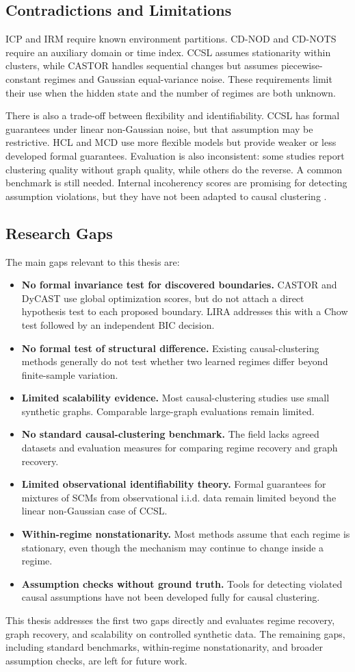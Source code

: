 \subsection{Contradictions and Limitations}

ICP and IRM require known environment partitions. CD-NOD and CD-NOTS require an
auxiliary domain or time index. CCSL assumes stationarity within clusters, while
CASTOR handles sequential changes but assumes piecewise-constant regimes and
Gaussian equal-variance noise. These requirements limit their use when the hidden
state and the number of regimes are both unknown.

There is also a trade-off between flexibility and identifiability. CCSL has formal
guarantees under linear non-Gaussian noise, but that assumption may be restrictive.
HCL and MCD use more flexible models but provide weaker or less developed formal
guarantees. Evaluation is also inconsistent: some studies report clustering quality
without graph quality, while others do the reverse. A common benchmark is still
needed. Internal incoherency scores are promising for detecting assumption
violations, but they have not been adapted to causal clustering
\cite{faltenbacher2025internal}.

\subsection{Research Gaps}
\label{ssec:gaps}

The main gaps relevant to this thesis are:
\begin{itemize}[leftmargin=1.4em]
\item \textbf{No formal invariance test for discovered boundaries.} CASTOR and
DyCAST use global optimization scores, but do not attach a direct hypothesis test
to each proposed boundary. LIRA addresses this with a Chow test followed by an
independent BIC decision.
\item \textbf{No formal test of structural difference.} Existing causal-clustering
methods generally do not test whether two learned regimes differ beyond finite-sample
variation.
\item \textbf{Limited scalability evidence.} Most causal-clustering studies use
small synthetic graphs. Comparable large-graph evaluations remain limited.
\item \textbf{No standard causal-clustering benchmark.} The field lacks agreed
datasets and evaluation measures for comparing regime recovery and graph recovery.
\item \textbf{Limited observational identifiability theory.} Formal guarantees for
mixtures of SCMs from observational i.i.d. data remain limited beyond the linear
non-Gaussian case of CCSL.
\item \textbf{Within-regime nonstationarity.} Most methods assume that each regime
is stationary, even though the mechanism may continue to change inside a regime.
\item \textbf{Assumption checks without ground truth.} Tools for detecting violated
causal assumptions have not been developed fully for causal clustering.
\end{itemize}

This thesis addresses the first two gaps directly and evaluates regime recovery,
graph recovery, and scalability on controlled synthetic data. The remaining gaps,
including standard benchmarks, within-regime nonstationarity, and broader
assumption checks, are left for future work.
